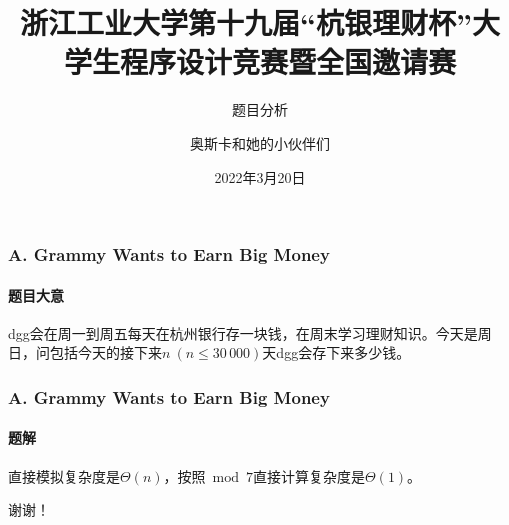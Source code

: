 \documentclass{beamer}
\title[] %
{浙江工业大学第十九届“杭银理财杯”大学生程序设计竞赛暨全国邀请赛}
\subtitle{题目分析}
\author[奥斯卡和她的小伙伴们]
{奥斯卡和她的小伙伴们}
\date[2022年3月20日] %
{2022年3月20日}
\begin{document}
\frame{\titlepage}

\begin{frame}
\frametitle{A. Grammy Wants to Earn Big Money}
\framesubtitle{题目大意}
dgg会在周一到周五每天在杭州银行存一块钱，在周末学习理财知识。今天是周日，问包括今天的接下来$n\ (n\leq 30\,000)$天dgg会存下来多少钱。

\end{frame}

\begin{frame}
\frametitle{A. Grammy Wants to Earn Big Money}
\framesubtitle{题解}

直接模拟复杂度是$\Theta(n)$，按照$\bmod 7$直接计算复杂度是$\Theta(1)$。

\end{frame}

\begin{frame}
\Huge{\centerline{谢谢！}}
\end{frame}
\end{document}
